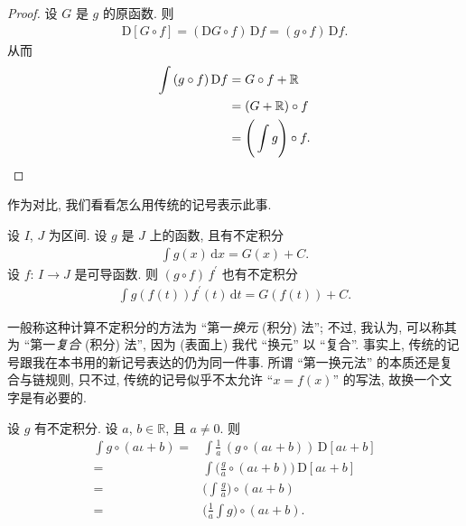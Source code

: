 \begin{proof}
    设 $G$ 是 $g$ 的原函数. 则
    \begin{align*}
        \mathrm{D}[G \circ f] = (\mathrm{D}G \circ f)\, \mathrm{D}f = (g \circ f)\, \mathrm{D}f.
    \end{align*}
    从而
    \begin{align*}
        \int {(g \circ f)\, \mathrm{D}f}
        = {} & G \circ f + \mathbb{R}                   \\
        = {} & (G + \mathbb{R}) \circ f                 \\
        = {} & \Bigg( \int {g} \Bigg) \circ f. \qedhere
    \end{align*}
\end{proof}

\begin{remark}
    作为对比, 我们看看怎么用传统的记号表示此事.

    设 $I$, $J$ 为区间. 设 $g$ 是 $J$ 上的函数, 且有不定积分
    \begin{align*}
        \int {g(x)\,\mathrm{d}x} = G(x) + C.
    \end{align*}
    设 $f$: $I \to J$ 是可导函数. 则 $(g \circ f)\, f^{\prime}$ 也有不定积分
    \begin{align*}
        \int {g(f(t))f^{\prime}(t)\,\mathrm{d}t} = G(f(t)) + C.
    \end{align*}

    一般称这种计算不定积分的方法为 ``第一\emph{换元} (积分) 法''; 不过, 我认为, 可以称其为 ``第一\emph{复合} (积分) 法'', 因为 (表面上) 我代 ``换元'' 以 ``复合''. 事实上, 传统的记号跟我在本书用的新记号表达的仍为同一件事. 所谓 ``第一换元法'' 的本质还是复合与链规则, 只不过, 传统的记号似乎不太允许 ``$x = f(x)$'' 的写法, 故换一个文字是有必要的.
\end{remark}

\begin{example}
    设 $g$ 有不定积分. 设 $a$, $b \in \mathbb{R}$, 且 $a \neq 0$. 则
    \begin{align*}
        \int {g \circ (a\iota + b)}
        = {} & \int {\frac{1}{a}\, (g \circ (a\iota + b))\,\mathrm{D}[a\iota + b]}         \\
        = {} & \int {\Bigg( \frac{g}{a} \circ (a\iota + b) \Bigg)\,\mathrm{D}[a\iota + b]} \\
        = {} & \Bigg( \int {\frac{g}{a}} \Bigg) \circ (a\iota + b)                         \\
        = {} & \Bigg( \frac{1}{a} \int {g} \Bigg) \circ (a\iota + b).
    \end{align*}
\end{example}

